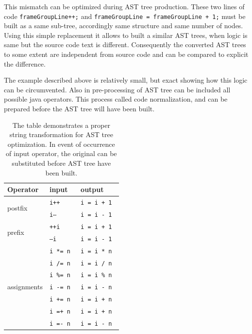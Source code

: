 \documentclass{report}
\begin{document}
This mismatch can be optimized during AST tree production. These two lines of code \texttt{frameGroupLine++;} and \texttt{frameGroupLine = frameGroupLine + 1;}
must be built as a same sub-tree, accordingly same structure and same number of nodes. Using this simple replacement it allows to built a similar AST trees, when logic is same but the source code text is different. Consequently the converted AST trees to some extent are independent from source code and can be compared to explicit the difference.

The example described above is relatively small, but exact showing how this logic can be circumvented. Also in pre-processing of AST tree can be included all possible java operators. This process called code normalization, and can be prepared before the AST tree will have been built. \\

\begin{table}[h]
\centering 
\begin{tabular}{|l|l|l|}
\hline
     Operator                        & input   & output     \\ \hline
\multirow{2}{*}{postfix}     & \texttt{i++}     & \texttt{i = i + 1  }  \\ \cline{2-3} 
                             & \texttt{i--}     & \texttt{i = i - 1  }  \\ \hline
\multirow{2}{*}{prefix}      & \texttt{++i}     & \texttt{i = i + 1 }   \\ \cline{2-3} 
                             & \texttt{--i }    & \texttt{i = i - 1}    \\ \hline
\multirow{7}{*}{assignments} & \texttt{i *= n } & \texttt{i = i * n } \\ \cline{2-3} 
                             & \texttt{i /= n  }& \texttt{i = i / n } \\ \cline{2-3} 
                             & \texttt{i \%= n }& \texttt{i = i \% n }\\ \cline{2-3} 
                             & \texttt{i -= n } & \texttt{i = i - n } \\ \cline{2-3} 
                             & \texttt{i += n  }& \texttt{i = i + n } \\ \cline{2-3} 
                             & \texttt{i =+ n } & \texttt{i = i + n}  \\ \cline{2-3} 
                             & \texttt{i =- n } & \texttt{i = i - n } \\ \hline
\end{tabular}
\caption[Combinations of statement substitutions to create more similar trees]{The table demonstrates a proper string transformation for AST tree optimization. In event of occurrence  of input operator, the original can be substituted before AST tree have been built.}
\label{table:operators}
\end{table}
\end{document}
